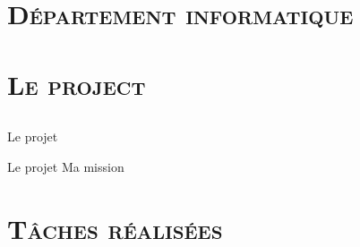 \documentclass[xcolor=x11names,compress]{beamer}
\begin{document}
\subsection{}

\begin{frame}

\end{frame}


\begin{frame}

\end{frame}


\section[Département]{\scshape Département informatique}
\subsection{}


\begin{frame}

\end{frame}


\section{\scshape Le project}
\subsection{}


\begin{frame}{Le projet}

\end{frame}



\begin{frame}{Le projet}
Ma mission 


\end{frame}




\section{\scshape Tâches réalisées}
\subsection{}


\begin{frame}

\end{frame}
\end{document}
